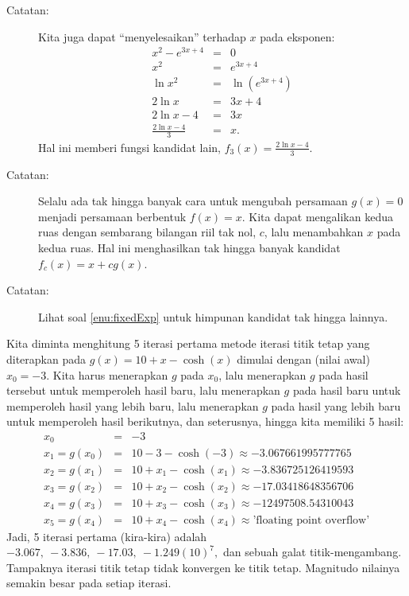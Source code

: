 \begin{description}
\begin{description}
\item [{Catatan:}] Kita juga dapat ``menyelesaikan'' terhadap $x$ pada
eksponen:
\begin{eqnarray*}
x^{2}-e^{3x+4} & = & 0\\
x^{2} & = & e^{3x+4}\\
\ln x^{2} & = & \ln(e^{3x+4})\\
2\ln x & = & 3x+4\\
2\ln x-4 & = & 3x\\
\frac{2\ln x-4}{3} & = & x.
\end{eqnarray*}
Hal ini memberi fungsi kandidat lain, $f_{3}(x)=\frac{2\ln x-4}{3}$. 
\item [{Catatan:}] Selalu ada tak hingga banyak cara untuk mengubah persamaan
$g(x)=0$ menjadi persamaan berbentuk $f(x)=x$. Kita dapat mengalikan
kedua ruas dengan sembarang bilangan riil tak nol, $c$, lalu menambahkan
$x$ pada kedua ruas. Hal ini menghasilkan tak hingga banyak kandidat
$f_{c}(x)=x+cg(x)$. 
\item [{Catatan:}] Lihat soal \ref{enu:fixedExp} untuk himpunan kandidat
tak hingga lainnya.
\end{description}
\item [{\ref{exc:fixedpt-10}:}] Kita diminta menghitung 5 iterasi pertama
metode iterasi titik tetap yang diterapkan pada $g(x)=10+x-\cosh(x)$
dimulai dengan (nilai awal) $x_{0}=-3$. Kita harus menerapkan $g$
pada $x_{0}$, lalu menerapkan $g$ pada hasil tersebut untuk memperoleh
hasil baru, lalu menerapkan $g$ pada hasil baru untuk memperoleh
hasil yang lebih baru, lalu menerapkan $g$ pada hasil yang lebih
baru untuk memperoleh hasil berikutnya, dan seterusnya, hingga kita
memiliki 5 hasil:
\begin{eqnarray*}
x_{0} & = & -3\\
x_{1}=g(x_{0}) & = & 10-3-\cosh(-3)\approx-3.067661995777765\\
x_{2}=g(x_{1}) & = & 10+x_{1}-\cosh(x_{1})\approx-3.836725126419593\\
x_{3}=g(x_{2}) & = & 10+x_{2}-\cosh(x_{2})\approx-17.03418648356706\\
x_{4}=g(x_{3}) & = & 10+x_{3}-\cosh(x_{3})\approx-12497508.54310043\\
x_{5}=g(x_{4}) & = & 10+x_{4}-\cosh(x_{4})\approx\mbox{'floating point overflow'}
\end{eqnarray*}
Jadi, 5 iterasi pertama (kira-kira) adalah $-3.067,\ -3.836,\ -17.03,\ -1.249(10)^{7},$
dan sebuah galat titik-mengambang. Tampaknya iterasi titik tetap tidak
konvergen ke titik tetap. Magnitudo nilainya semakin besar pada setiap
iterasi.


\end{description}

